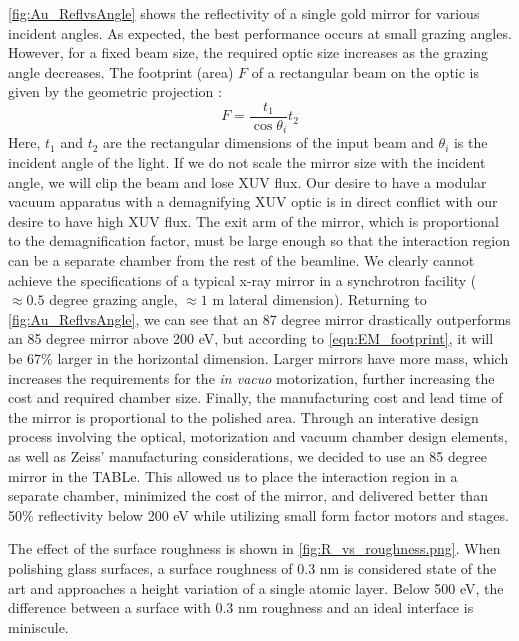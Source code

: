 \cref{fig:Au_ReflvsAngle} shows the reflectivity of a single gold mirror for various incident angles. As expected, the best performance occurs at small grazing angles. However, for a fixed beam size, the required optic size increases as the grazing angle decreases. The footprint (area) $F$ of a rectangular beam on the optic is given by the geometric projection \cite{gibaudSpecularReflectivitySmooth2009}:
\begin{equation}
F = \frac{t_1}{\cos \theta_i}t_2
\label{eqn:EM_footprint}
\end{equation}
Here, $t_1$ and $t_2$ are the rectangular dimensions of the input beam and $\theta_i$ is the incident angle of the light. If we do not scale the mirror size with the incident angle, we will clip the beam and lose XUV flux. Our desire to have a modular vacuum apparatus with a demagnifying XUV optic is in direct conflict with our desire to have high XUV flux. The exit arm of the mirror, which is proportional to the demagnification factor, must be large enough so that the interaction region can be a separate chamber from the rest of the beamline. We clearly cannot achieve the specifications of a typical x-ray mirror in a synchrotron facility ($\approx 0.5$ degree grazing angle, $\approx 1$ m lateral dimension). Returning to \cref{fig:Au_ReflvsAngle}, we can see that an 87 degree mirror drastically outperforms an 85 degree mirror above 200 eV, but according to \cref{eqn:EM_footprint}, it will be 67\% larger in the horizontal dimension. Larger mirrors have more mass, which increases the requirements for the \textit{in vacuo} motorization, further increasing the cost and required chamber size. Finally, the manufacturing cost and lead time of the mirror is proportional to the polished area. Through an interative design process involving the optical, motorization and vacuum chamber design elements, as well as Zeiss' manufacturing considerations, we decided to use an 85 degree mirror in the TABLe. This allowed us to place the interaction region in a separate chamber, minimized the cost of the mirror, and delivered better than 50\% reflectivity below 200 eV while utilizing small form factor motors and stages. 

The effect of the surface roughness is shown in \cref{fig:R_vs_roughness.png}. When polishing glass surfaces, a surface roughness of 0.3 nm is considered state of the art and approaches a height variation of a single atomic layer. Below 500 eV, the difference between a surface with 0.3 nm roughness and an ideal interface is miniscule. 

